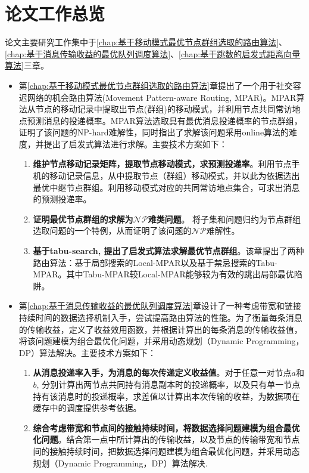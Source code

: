 \chapter{论文工作总览}

论文主要研究工作集中于\ref{chap:基于移动模式最优节点群组选取的路由算法}、\ref{chap:基于消息传输收益的最优队列调度算法}、\ref{chap:基于跳数的启发式距离向量算法}三章。

\begin{itemize}
\item 第\ref{chap:基于移动模式最优节点群组选取的路由算法}章提出了一个用于社交容迟网络的机会路由算法(Movement Pattern-aware Routing, MPAR)。MPAR算法从节点的移动记录中提取出节点(群组)的移动模式，并利用节点共同常访地点预测消息的投递概率。MPAR算法选取具有最优消息投递概率的节点群组，证明了该问题的NP-hard难解性，同时指出了求解该问题采用online算法的难度，并提出了启发式算法进行求解。主要技术方案如下：
\begin{enumerate}
\item \textbf{维护节点移动记录矩阵，提取节点移动模式，求预测投递率}。利用节点手机的移动记录信息，从中提取节点（群组）移动模式，并以此为依据选出最优中继节点群组。利用移动模式对应的共同常访地点集合，可求出消息的预测投递率。

\item \textbf{证明最优节点群组的求解为$\mathcal{NP}$难类问题}。
将子集和问题归约为节点群组选取问题的一个特例，从而证明了该问题的$\mathcal{NP}$难解性。

\item \textbf{基于tabu-search, 提出了启发式算法求解最优节点群组}。该章提出了两种路由算法：基于局部搜索的Local-MPAR以及基于禁忌搜索的Tabu-MPAR。其中Tabu-MPAR较Local-MPAR能够较为有效的跳出局部最优陷阱。
\end{enumerate}


\item 第\ref{chap:基于消息传输收益的最优队列调度算法}章设计了一种考虑带宽和链接持续时间的数据选择机制入手，尝试提高路由算法的性能。为了衡量每条消息的传输收益，定义了收益效用函数，并根据计算出的每条消息的传输收益值，将该问题建模为组合最优化问题，并采用动态规划（Dynamic Programming，DP）算法解决。主要技术方案如下：
\begin{enumerate}
\item \textbf{从消息投递率入手，为消息的每次传递定义收益值}。对于任意一对节点$a$和$b$, 分别计算出两节点共同持有消息副本时的投递概率，以及只有单一节点持有该消息时的投递概率，求差值以计算出本次传输的收益，为数据项在缓存中的调度提供参考依据。
\item \textbf{综合考虑带宽和节点间的接触持续时间，将数据选择问题建模为组合最优化问题}。结合第一点中所计算出的传输收益，以及节点的传输带宽和节点间的接触持续时间，把数据选择问题建模为组合最优化问题，并采用动态规划（Dynamic Programming，DP）算法解决.
\end{enumerate}


\end{itemize}
